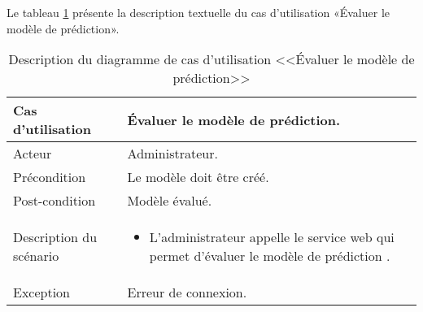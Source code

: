 \newpage
Le tableau \ref{tab:EvaluationModèle} présente la description textuelle du cas d’utilisation «Évaluer le modèle de prédiction».
\begin{longtable}[c]{
    |p{}
    |p{}|
}
    \caption{Description du diagramme de cas d’utilisation <<Évaluer le modèle de prédiction>>}
    \label{tab:EvaluationModèle}\\
    \hline
    
    Cas d’utilisation
    & Évaluer le modèle de prédiction. \\
    \hline 
    
    Acteur
    & Administrateur. \\
    \hline 
    
    Précondition
    & Le modèle doit être créé. \\
    \hline
    
    Post-condition
    & Modèle évalué. \\
    \hline
    
    Description du
scénario

    &     \begin{itemize}
    \item L’administrateur appelle le service web qui permet d'évaluer le modèle de prédiction .
    \end{itemize} \\
    \hline
    
   Exception
    & Erreur  de connexion.
 \\ \hline
   
\end{longtable}


